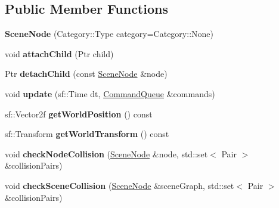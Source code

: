 \subsection*{Public Member Functions}
\begin{DoxyCompactItemize}
\item 
\hypertarget{class_scene_node_ae6066cf0e6c0bddbc06e6d09bac918e9}{}{\bfseries Scene\+Node} (Category\+::\+Type category=Category\+::\+None)\label{class_scene_node_ae6066cf0e6c0bddbc06e6d09bac918e9}

\item 
\hypertarget{class_scene_node_acdfa2c2ba28bce076c886eaba2d9e650}{}void {\bfseries attach\+Child} (Ptr child)\label{class_scene_node_acdfa2c2ba28bce076c886eaba2d9e650}

\item 
\hypertarget{class_scene_node_ae7bfc285268dcbda5d406e0185f63262}{}Ptr {\bfseries detach\+Child} (const \hyperlink{class_scene_node}{Scene\+Node} \&node)\label{class_scene_node_ae7bfc285268dcbda5d406e0185f63262}

\item 
\hypertarget{class_scene_node_a5494c3a380d7ea5ae7148122c4255400}{}void {\bfseries update} (sf\+::\+Time dt, \hyperlink{class_command_queue}{Command\+Queue} \&commands)\label{class_scene_node_a5494c3a380d7ea5ae7148122c4255400}

\item 
\hypertarget{class_scene_node_a410150636d06294c7a9e238d8c4f07b5}{}sf\+::\+Vector2f {\bfseries get\+World\+Position} () const \label{class_scene_node_a410150636d06294c7a9e238d8c4f07b5}

\item 
\hypertarget{class_scene_node_a88be3d3c93c80ee4a7ba25024d2414ec}{}sf\+::\+Transform {\bfseries get\+World\+Transform} () const \label{class_scene_node_a88be3d3c93c80ee4a7ba25024d2414ec}

\item 
\hypertarget{class_scene_node_afcb3176686c13d320ca0bfb0c22bbd4f}{}void {\bfseries check\+Node\+Collision} (\hyperlink{class_scene_node}{Scene\+Node} \&node, std\+::set$<$ Pair $>$ \&collision\+Pairs)\label{class_scene_node_afcb3176686c13d320ca0bfb0c22bbd4f}

\item 
\hypertarget{class_scene_node_adc84f9ef6a872340ff5489b54d9bf626}{}void {\bfseries check\+Scene\+Collision} (\hyperlink{class_scene_node}{Scene\+Node} \&scene\+Graph, std\+::set$<$ Pair $>$ \&collision\+Pairs)\label{class_scene_node_adc84f9ef6a872340ff5489b54d9bf626}


\end{DoxyCompactItemize}
